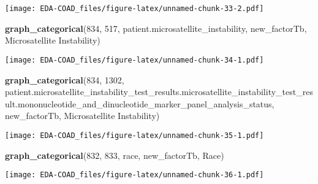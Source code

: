 \documentclass[
]{article}
\newenvironment{Shaded}{\begin{snugshade}}{\end{snugshade}}
\newcommand{\DecValTok}[1]{\textcolor[rgb]{0.00,0.00,0.81}{#1}}
\newcommand{\FunctionTok}[1]{\textcolor[rgb]{0.13,0.29,0.53}{\textbf{#1}}}
\newcommand{\NormalTok}[1]{#1}
\newcommand{\StringTok}[1]{\textcolor[rgb]{0.31,0.60,0.02}{#1}}
\begin{document}
\texttt{[image: EDA-COAD\_files/figure-latex/unnamed-chunk-33-2.pdf]}

\begin{Shaded}
\begin{Highlighting}[]
\FunctionTok{graph\_categorical}\NormalTok{(}\DecValTok{834}\NormalTok{, }\DecValTok{517}\NormalTok{, }\StringTok{\textquotesingle{}patient.microsatellite\_instability\textquotesingle{}}\NormalTok{, new\_factorTb, }\StringTok{\textquotesingle{}Microsatellite Instability\textquotesingle{}}\NormalTok{)}
\end{Highlighting}
\end{Shaded}

\texttt{[image: EDA-COAD\_files/figure-latex/unnamed-chunk-34-1.pdf]}

\begin{Shaded}
\begin{Highlighting}[]
\FunctionTok{graph\_categorical}\NormalTok{(}\DecValTok{834}\NormalTok{, }\DecValTok{1302}\NormalTok{, }\StringTok{\textquotesingle{}patient.microsatellite\_instability\_test\_results.microsatellite\_instability\_test\_result.mononucleotide\_and\_dinucleotide\_marker\_panel\_analysis\_status\textquotesingle{}}\NormalTok{, new\_factorTb, }\StringTok{\textquotesingle{}Microsatellite Instability\textquotesingle{}}\NormalTok{)}
\end{Highlighting}
\end{Shaded}

\texttt{[image: EDA-COAD\_files/figure-latex/unnamed-chunk-35-1.pdf]}

\begin{Shaded}
\begin{Highlighting}[]
\FunctionTok{graph\_categorical}\NormalTok{(}\DecValTok{832}\NormalTok{, }\DecValTok{833}\NormalTok{, }\StringTok{\textquotesingle{}race\textquotesingle{}}\NormalTok{, new\_factorTb, }\StringTok{\textquotesingle{}Race\textquotesingle{}}\NormalTok{)}
\end{Highlighting}
\end{Shaded}

\texttt{[image: EDA-COAD\_files/figure-latex/unnamed-chunk-36-1.pdf]}
\end{document}
